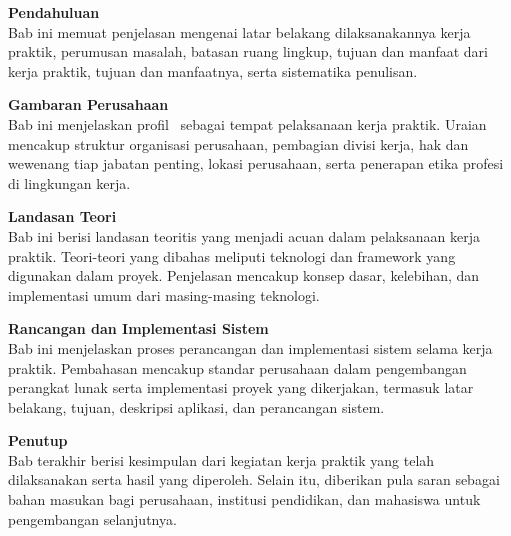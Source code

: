 
\vspace{0.3cm}
\begin{description}[leftmargin=2.2cm, labelsep=0cm, itemsep=0.1cm]
  \item[{\makebox[2.2cm][l]{\textbf{BAB I}}}] \textbf{Pendahuluan}\\
    Bab ini memuat penjelasan mengenai latar belakang dilaksanakannya kerja
    praktik, perumusan masalah, batasan ruang lingkup, tujuan dan manfaat dari
    kerja praktik, tujuan dan manfaatnya, serta sistematika penulisan.

  \item[{\makebox[2.2cm][l]{\textbf{BAB II}}}] \textbf{Gambaran Perusahaan}\\
    Bab ini menjelaskan profil \NamaPerusahaan\ sebagai tempat pelaksanaan
    kerja praktik. Uraian mencakup struktur organisasi perusahaan, pembagian
    divisi kerja, hak dan wewenang tiap jabatan penting, lokasi perusahaan,
    serta penerapan etika profesi di lingkungan kerja.

  \item[{\makebox[2.2cm][l]{\textbf{BAB III}}}] \textbf{Landasan Teori}\\
    Bab ini berisi landasan teoritis yang menjadi acuan dalam pelaksanaan kerja
    praktik. Teori-teori yang dibahas meliputi teknologi dan framework yang
    digunakan dalam proyek. Penjelasan mencakup konsep dasar, kelebihan, dan
    implementasi umum dari masing-masing teknologi.

  \item[{\makebox[2.2cm][l]{\textbf{BAB IV}}}] \textbf{Rancangan dan Implementasi Sistem}\\
    Bab ini menjelaskan proses perancangan dan implementasi sistem selama kerja
    praktik. Pembahasan mencakup standar perusahaan dalam pengembangan perangkat
    lunak serta implementasi proyek yang dikerjakan, termasuk latar belakang,
    tujuan, deskripsi aplikasi, dan perancangan sistem.

  \item[{\makebox[2.2cm][l]{\textbf{BAB V}}}] \textbf{Penutup}\\
    Bab terakhir berisi kesimpulan dari kegiatan kerja praktik yang telah
    dilaksanakan serta hasil yang diperoleh. Selain itu, diberikan pula saran
    sebagai bahan masukan bagi perusahaan, institusi pendidikan, dan mahasiswa
    untuk pengembangan selanjutnya.
\end{description}

